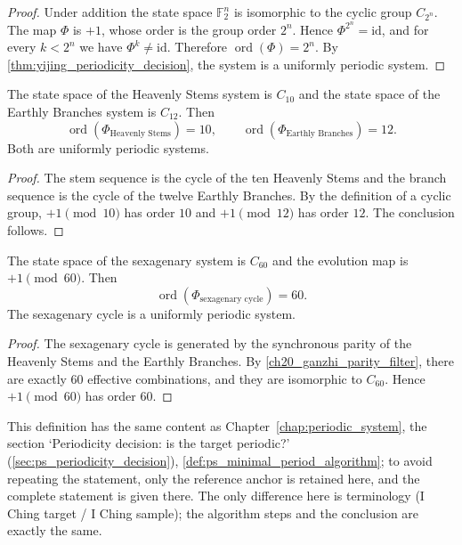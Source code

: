 \begin{proof}
Under addition the state space $\mathbb F_2^n$ is isomorphic to the cyclic group $C_{2^n}$. The map $\Phi$ is $+1$, whose order is the group order $2^n$. Hence $\Phi^{2^n}=\mathrm{id}$, and for every $k<2^n$ we have $\Phi^k\neq\mathrm{id}$. Therefore $\operatorname{ord}(\Phi)=2^n$. By \cref{thm:yijing_periodicity_decision}, the system is a uniformly periodic system.
\end{proof}

\begin{lemma}\label{lem:yijing_ganzhi_finite_order}
The state space of the Heavenly Stems system is $C_{10}$ and the state space of the Earthly Branches system is $C_{12}$. Then
\[
\operatorname{ord}(\Phi_{\text{Heavenly Stems}})=10,\qquad
\operatorname{ord}(\Phi_{\text{Earthly Branches}})=12.
\]
Both are uniformly periodic systems.
\end{lemma}

\begin{proof}
The stem sequence is the cycle of the ten Heavenly Stems and the branch sequence is the cycle of the twelve Earthly Branches. By the definition of a cyclic group, $+1\pmod{10}$ has order $10$ and $+1\pmod{12}$ has order $12$. The conclusion follows.
\end{proof}

\begin{lemma}\label{lem:yijing_ganzhi60_finite_order}
The state space of the sexagenary system is $C_{60}$ and the evolution map is $+1\pmod{60}$. Then
\[
\operatorname{ord}(\Phi_{\text{sexagenary cycle}})=60.
\]
The sexagenary cycle is a uniformly periodic system.
\end{lemma}

\begin{proof}
The sexagenary cycle is generated by the synchronous parity of the Heavenly Stems and the Earthly Branches. By \cref{ch20_ganzhi_parity_filter}, there are exactly $60$ effective combinations, and they are isomorphic to $C_{60}$. Hence $+1\pmod{60}$ has order $60$.
\end{proof}

\begin{definition}\label{def:yijing_minimal_period_algorithm}
This definition has the same content as Chapter~\ref{chap:periodic_system}, the section `Periodicity decision: is the target periodic?' (\cref{sec:ps_periodicity_decision}), \cref{def:ps_minimal_period_algorithm}; to avoid repeating the statement, only the reference anchor is retained here, and the complete statement is given there. The only difference here is terminology (I Ching target / I Ching sample); the algorithm steps and the conclusion are exactly the same.
\end{definition}

